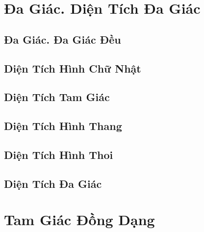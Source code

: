 \documentclass{article}
\numberwithin{equation}{section}
\begin{document}
\section{Đa Giác. Diện Tích Đa Giác}

\subsection{Đa Giác. Đa Giác Đều}


\subsection{Diện Tích Hình Chữ Nhật}


\subsection{Diện Tích Tam Giác}


\subsection{Diện Tích Hình Thang}


\subsection{Diện Tích Hình Thoi}


\subsection{Diện Tích Đa Giác}


\section{Tam Giác Đồng Dạng}
\end{document}
